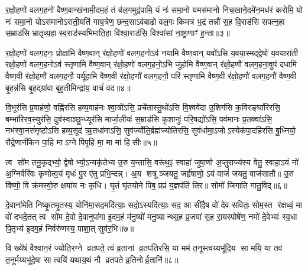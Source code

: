 {\anuvakamend[{द्वेष॑ इ॒मा अ॒ष्टाद॑श च॥१॥}]}

र॒क्षो॒हणो॑ वलग॒हनो॑ वैष्ण॒वान्ख॑नामी॒दम॒हं तं व॑ल॒गमुद्व॑पामि॒ यं नः॑ समा॒नो यमस॑मानो निच॒खाने॒दमे॑न॒मध॑रं करोमि॒ यो नः॑ समा॒नो योऽस॑मानोऽराती॒यति॑ गाय॒त्रेण॒ छन्द॒साऽव॑बाढो वल॒गः किमत्र॑ भ॒द्रं तन्नौ॑ स॒ह वि॒राड॑सि सपत्न॒हा स॒म्राड॑सि भ्रातृव्य॒हा स्व॒राड॑स्यभिमाति॒हा वि॑श्वा॒राड॑सि॒ विश्वा॑सां ना॒ष्ट्राणाꣳ॑ ह॒न्ता॥३॥

र॒क्षो॒हणो॑ वलग॒हनः॒ प्रोक्षा॑मि वैष्ण॒वान् र॑क्षो॒हणो॑ वलग॒हनोऽव॑ नयामि वैष्ण॒वान् यवो॑ऽसि य॒वया॒स्मद्द्वेषो॑ य॒वयारा॑ती रक्षो॒हणो॑ वलग॒हनोऽव॑ स्तृणामि वैष्ण॒वान् र॑क्षो॒हणो॑ वलग॒हनो॒ऽभि जु॑होमि वैष्ण॒वान् र॑क्षो॒हणौ॑ वलग॒हना॒वुप॑ दधामि वैष्ण॒वी र॑क्षो॒हणौ॑ वलग॒हनौ॒ पर्यू॑हामि वैष्ण॒वी र॑क्षो॒हणौ॑ वलग॒हनौ॒ परि॑ स्तृणामि वैष्ण॒वी र॑क्षो॒हणौ॑ वलग॒हनौ॑ वैष्ण॒वी बृ॒हन्न॑सि बृ॒हद्ग्रा॑वा बृह॒तीमिन्द्रा॑य॒ वाचं॑ वद॥४॥

{\anuvakamend[{ह॒न्तेन्द्रा॑य॒ द्वे च॑॥२॥}]}

वि॒भूर॑सि प्र॒वाह॑णो॒ वह्नि॑रसि हव्य॒वाह॑नः श्वा॒त्रो॑ऽसि॒ प्रचे॑तास्तु॒थो॑ऽसि वि॒श्ववे॑दा उ॒शिग॑सि क॒विरङ्घा॑रिरसि॒ बम्भा॑रिरव॒स्युर॑सि॒ दुव॑स्वाञ्छु॒न्ध्यूर॑सि मार्जा॒लीयः॑ स॒म्राड॑सि कृ॒शानुः॑ परि॒षद्यो॑ऽसि॒ पव॑मानः प्र॒तक्वा॑ऽसि॒ नभ॑स्वा॒नसं॑मृष्टोऽसि हव्य॒सूद॑ ऋ॒तधा॑माऽसि॒ सुव॑र्ज्योति॒र्ब्रह्म॑ज्योतिरसि॒ सुव॑र्धामा॒ऽजोऽस्येक॑पा॒दहि॑रसि बु॒ध्नियो॒ रौद्रे॒णानी॑केन पा॒हि माऽग्ने पिपृ॒हि मा॒ मा मा॑ हिसीः॥५॥

{\anuvakamend[{अनी॑केना॒ष्टौ च॑॥३॥}]}

त्व सो॑म तनू॒कृद्भ्यो॒ द्वेषोभ्यो॒ऽन्यकृ॑तेभ्य उ॒रु य॒न्तासि॒ वरू॑थ॒ꣵ॒ स्वाहा॑ जुषा॒णो अ॒प्तुराज्य॑स्य वेतु॒ स्वाहा॒ऽयं नो॑ अ॒ग्निर्वरि॑वः कृणोत्व॒यं मृधः॑ पु॒र ए॑तु प्रभि॒न्दन्न्। अ॒य शत्रूञ्जयतु॒ जर्हृ॑षाणो॒ ऽयं वाजं॑ जयतु॒ वाज॑सातौ॥ उ॒रु वि॑ष्णो॒ वि क्र॑मस्वो॒रु क्षया॑य नः कृधि। घृ॒तं घृ॑तयोने पिब॒ प्रप्र॑ य॒ज्ञप॑तिं तिर॥ सोमो॑ जिगाति गातु॒विद्॥६॥

दे॒वाना॑मेति निष्कृ॒तमृ॒तस्य॒ योनि॑मा॒सद॒मदि॑त्याः॒ सदो॒ऽस्यदि॑त्याः॒ सद॒ आ सी॑दै॒ष वो॑ देव सवितः॒ सोम॒स्त र॑क्षध्वं॒ मा वो॑ दभदे॒तत् त्व सो॑म दे॒वो दे॒वानुपा॑गा इ॒दम॒हं म॑नु॒ष्यो॑ मनु॒ष्यान्थ्स॒ह प्र॒जया॑ स॒ह रा॒यस्पोषे॑ण॒ नमो॑ दे॒वेभ्यः॑ स्व॒धा पि॒तृभ्य॑ इ॒दम॒हं निर्वरु॑णस्य॒ पाशा॒त् सुव॑र॒भि॥७॥

वि ख्ये॑षं वैश्वान॒रं ज्योति॒रग्ने व्रतपते॒ त्वं व्र॒तानां व्र॒तप॑तिरसि॒ या मम॑ त॒नूस्त्वय्यभू॑दि॒य सा मयि॒ या तव॑ त॒नूर्मय्यभू॑दे॒षा सा त्वयि॑ यथाय॒थं नौ व्रतपते व्र॒तिनोर्व्र॒तानि॑॥८॥

{\anuvakamend[{गा॒तु॒विद॒भ्येक॑त्रिशच्च॥४॥}]}

